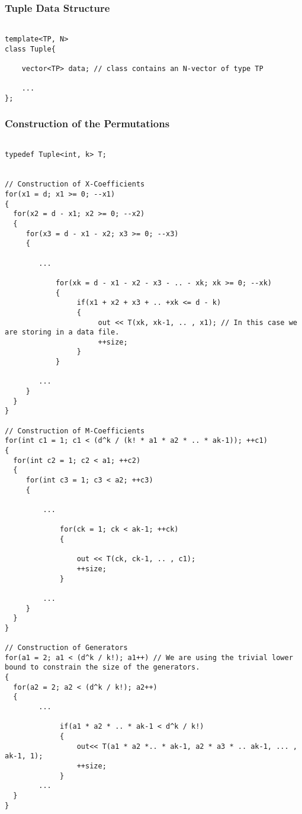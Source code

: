 \subsubsection*{Tuple Data Structure}

\begin{lstlisting}

template<TP, N>
class Tuple{

    vector<TP> data; // class contains an N-vector of type TP

    ...
};

\end{lstlisting}

\subsubsection*{Construction of the Permutations}

\begin{lstlisting}

typedef Tuple<int, k> T;


// Construction of X-Coefficients
for(x1 = d; x1 >= 0; --x1)
{
  for(x2 = d - x1; x2 >= 0; --x2)
  {
     for(x3 = d - x1 - x2; x3 >= 0; --x3) 
     {
    
        ...
            
            for(xk = d - x1 - x2 - x3 - .. - xk; xk >= 0; --xk)
            {
                 if(x1 + x2 + x3 + .. +xk <= d - k)
                 {
                      out << T(xk, xk-1, .. , x1); // In this case we are storing in a data file.
                      ++size;
                 }
            }

        ...
     }	
  }
}

// Construction of M-Coefficients
for(int c1 = 1; c1 < (d^k / (k! * a1 * a2 * .. * ak-1)); ++c1)
{
  for(int c2 = 1; c2 < a1; ++c2)
  {
     for(int c3 = 1; c3 < a2; ++c3)
     {

         ...

             for(ck = 1; ck < ak-1; ++ck)
             {

                 out << T(ck, ck-1, .. , c1);
                 ++size;
             }

         ...
     }
  }
}

// Construction of Generators
for(a1 = 2; a1 < (d^k / k!); a1++) // We are using the trivial lower bound to constrain the size of the generators.
{
  for(a2 = 2; a2 < (d^k / k!); a2++)
  {
        ...

             if(a1 * a2 * .. * ak-1 < d^k / k!)
             {
                 out<< T(a1 * a2 *.. * ak-1, a2 * a3 * .. ak-1, ... , ak-1, 1);
                 ++size;
             }
        ...
  }
}


\end{lstlisting}

